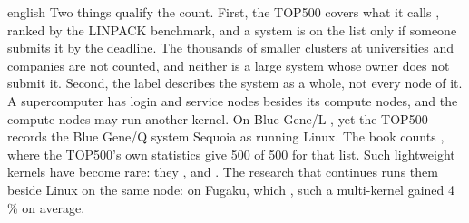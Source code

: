 \begin{onlyin}{english}
Two things qualify the count.  First, the TOP500 covers what it calls
, ranked by the LINPACK
benchmark\autocite{Top500Introduction2026}, and a system is on the list
only if someone submits it by the deadline\autocite{Top500Participation2026}.
The thousands of smaller clusters at universities and companies are not
counted, and neither is a large system whose owner does not submit it.
Second, the label describes the system as a whole, not every node of it.
A supercomputer has login and service nodes besides its compute
nodes\autocite[4]{Gerofi2019Intro}, and the compute nodes may run another
kernel.  On Blue Gene/L , yet the TOP500 records
the Blue Gene/Q system Sequoia as running Linux\autocite{Top500Sequoia2026}.
The book counts ,
where the TOP500's own statistics give 500 of 500 for that
list\autocite{Top500OSFamily2026}.  Such lightweight kernels have become
rare: they , and
.  The research that continues runs them
beside Linux on the same node: on Fugaku, which
,
such a multi-kernel gained 4\,\% on average\autocite{Gerofi2021McKernel}.
\end{onlyin}
